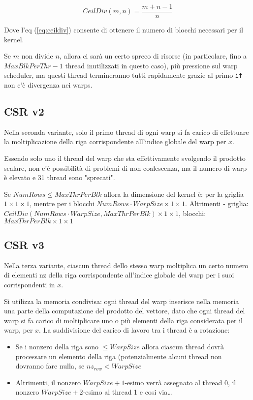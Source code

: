 \documentclass[9pt]{extarticle}
\begin{document}
\begin{equation}\label{eq:ceildiv}
CeilDiv(m,n) = \frac{m + n - 1}{n}
\end{equation}

Dove l'eq (\ref{eq:ceildiv}) consente di ottenere il numero di blocchi necessari per il kernel.

Se $m$ non divide $n$, allora ci sarà un certo spreco di risorse 
(in particolare, fino a $MaxBlkPerThr - 1$ thread inutilizzati in questo caso), più pressione sul warp scheduler,
ma questi thread termineranno tutti rapidamente grazie al primo \texttt{if} - non c'è divergenza nei warps.

\subsection{CSR v2}
Nella seconda variante, solo il primo thread di ogni warp si fa carico di effettuare la moltiplicazione della riga 
corrispondente all'indice globale del warp per $x$.

Essendo solo uno il thread del warp che sta effettivamente svolgendo il prodotto scalare, non c'è possibilità di
problemi di non coalescenza, ma il numero di warp è elevato e 31 thread sono "sprecati".

Se $NumRows \le MaxThrPerBlk$ allora la dimensione del kernel è: per la griglia $1 \times 1 \times 1$, mentre per i
blocchi $NumRows \cdot WarpSize \times 1 \times 1$. Altrimenti - griglia: $CeilDiv(NumRows \cdot WarpSize, MaxThrPerBlk) \times 1 \times 1$, blocchi: $MaxThrPerBlk \times 1 \times 1$

\subsection{CSR v3}
Nella terza variante, ciascun thread dello stesso warp moltiplica un certo numero di elementi nz della riga corrispondente
all'indice globale del warp per i suoi corrispondenti in $x$.

Si utilizza la memoria condivisa: ogni thread del warp inserisce nella memoria una parte della computazione del prodotto
del vettore, dato che ogni thread del warp si fa carico di moltiplicare uno o più elementi della riga considerata 
per il warp, per $x$. La suddivisione del carico di lavoro tra i thread è a rotazione:
\begin{itemize}
	\item Se i nonzero della riga sono $\le WarpSize$ allora ciascun thread dovrà processare un elemento della riga
	(potenzialmente alcuni thread non dovranno fare nulla, se $nz_{row} < WarpSize$
	
	\item Altrimenti, il nonzero $WarpSize + 1$-esimo verrà assegnato al thread 0, il nonzero $WarpSize + 2$-esimo 
	al thread 1 e cosi via\dots
\end{itemize}
\end{document}
